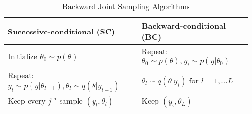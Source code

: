 \begin{table}
    \caption{Backward Joint Sampling Algorithms}
    \label{tab:sampling}
    \centering
    \begin{tabular}{l|l}
    \toprule
        Successive-conditional (SC) & Backward-conditional (BC) \\
    \midrule  
    
    Initialize $\theta_{0} \sim p(\theta)$                                      & Repeat: $\theta_{0} \sim p(\theta), y_{i} \sim p(y|\theta_{0})$ \\
    Repeat: $y_{l} \sim p(y|\theta_{l-1}), \theta_{l} \sim q(\theta|y_{l-1})$   & \qquad $\theta_{l} \sim q(\theta|y_{i})$ for $l=1,...L$ \\
    Keep every $j^{\text{th}}$ sample $(y_{l}, \theta_{l})$                     & \qquad Keep $(y_{i}, \theta_{L})$ \\
    \bottomrule
    \end{tabular}
\end{table}



